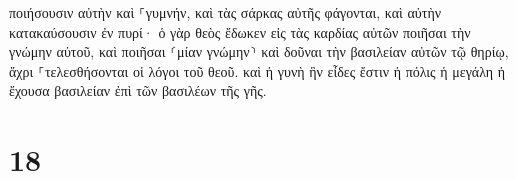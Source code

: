 \documentclass{openreader}
\begin{document}
ποιήσουσιν αὐτὴν καὶ ⸀γυμνήν, καὶ τὰς σάρκας αὐτῆς φάγονται, καὶ αὐτὴν κατακαύσουσιν ἐν πυρί· ὁ γὰρ θεὸς ἔδωκεν εἰς τὰς καρδίας αὐτῶν ποιῆσαι τὴν γνώμην αὐτοῦ, καὶ ποιῆσαι ⸂μίαν γνώμην⸃ καὶ δοῦναι τὴν βασιλείαν αὐτῶν τῷ θηρίῳ, ἄχρι ⸀τελεσθήσονται οἱ λόγοι τοῦ θεοῦ. καὶ ἡ γυνὴ ἣν εἶδες ἔστιν ἡ πόλις ἡ μεγάλη ἡ ἔχουσα βασιλείαν ἐπὶ τῶν βασιλέων τῆς γῆς. \section*{18}
\end{document}
